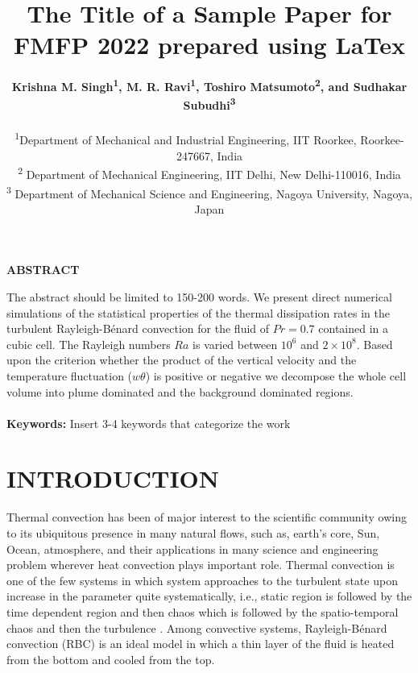 \documentclass[10pt, conference]{FMFP2022}
\begin{document}
\title{\LARGE{ \bf The Title of a Sample Paper for FMFP 2022 prepared using LaTex}}
\author{\textbf{Krishna M. Singh\textsuperscript{1}, M. R. Ravi\textsuperscript{1}, Toshiro Matsumoto\textsuperscript{2}, and Sudhakar Subudhi\textsuperscript{3}}\\\\
\textsuperscript{1}\small{Department of Mechanical and Industrial Engineering, IIT Roorkee, Roorkee-247667, India}\\
\textsuperscript{2} \small{Department of Mechanical Engineering, IIT Delhi, New Delhi-110016, India}\\
\textsuperscript{3} \small{Department of Mechanical Science and Engineering, Nagoya University, Nagoya, Japan}}

\maketitle
\thispagestyle{fancy} 
\pagestyle{plain} %

\noindent \textbf{ABSTRACT}

The abstract should be limited to 150-200 words. We present direct numerical simulations of the statistical properties of the thermal dissipation rates in the turbulent Rayleigh-B\'{e}nard convection for the fluid of $Pr=0.7$ contained in a cubic cell. The Rayleigh numbers $Ra$ is varied between $10^6$ and $2\times10^8$. Based upon the criterion whether the product of the vertical velocity and the temperature fluctuation ($w\theta$) is positive or negative we decompose the whole cell volume into plume dominated and the background dominated regions.
\\\\
\noindent
\textbf{Keywords:} Insert 3-4 keywords that categorize the work\\

\section{{\textbf{INTRODUCTION}}}
Thermal convection has been of major interest to the scientific community owing to its ubiquitous presence in many natural flows, such as, earth's core, Sun, Ocean, atmosphere, and their applications in many science and engineering problem wherever heat convection plays important role. Thermal convection is one of the few systems in which system approaches to the turbulent state upon increase in the parameter quite systematically, i.e., static region is followed by the time dependent region and then chaos which is followed by the spatio-temporal chaos and then the turbulence \cite{Gsell2017}. Among convective systems, Rayleigh-B\'{e}nard convection (RBC) is an ideal model in which a thin layer of the fluid is heated from the bottom and cooled from the top. 
\end{document}
